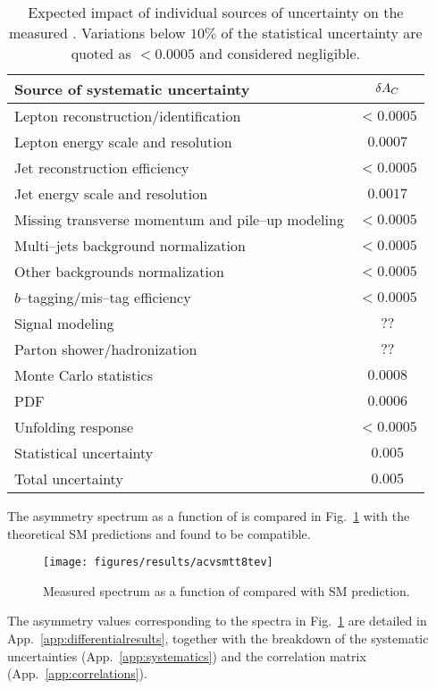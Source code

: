 \begin{table}[!htb]\centering
\begin{tabular}{l c}
\toprule
Source of systematic uncertainty  & $\delta{\ensuremath{A_C}{}}$ \\
\midrule
Lepton reconstruction/identification    & $<0.0005$\\
Lepton energy scale and resolution      &  $0.0007$\\
Jet reconstruction efficiency                 &  $<0.0005$ \\
Jet energy scale and resolution             &  $0.0017$ \\
Missing transverse momentum and pile--up modeling& $<0.0005$\\
Multi--jets background normalization & $<0.0005$\\
Other backgrounds normalization        & $<0.0005$\\
$b$--tagging/mis--tag efficiency       & $<0.0005$\\
Signal modeling                                    & $??$\\
Parton shower/hadronization                & $??$\\
Monte Carlo statistics                            & $0.0008$\\
PDF                                                        &$0.0006$\\
Unfolding response                               &$<0.0005$\\
\midrule
Statistical uncertainty                           & $0.005$ \\
\midrule
Total uncertainty                                   & $0.005$ \\
\bottomrule
\end{tabular}
\caption{Expected impact of individual sources of uncertainty on the
  measured \ac{}. Variations below $10\%$ of the
  statistical uncertainty are quoted as $<0.0005$ and considered negligible.}
\label{tab:8tevsystematics}
\end{table}

The asymmetry spectrum as a function of
\mtt{} is compared in Fig.~\ref{fig:8tevacvsmtt}
with the theoretical SM predictions and found to be compatible. 

\begin{figure}[!htb]\centering
  \texttt{[image: figures/results/acvsmtt8tev]}
  \caption{Measured \ac{} spectrum as a function of \mtt{} compared with SM prediction.}
  \label{fig:8tevacvsmtt}
\end{figure}

The asymmetry values corresponding to the spectra in
Fig.~\ref{fig:8tevacvsmtt} are detailed in
App.~\ref{app:differentialresults}, together with the breakdown of the
systematic uncertainties (App.~\ref{app:systematics}) and the
correlation matrix (App.~\ref{app:correlations}).

